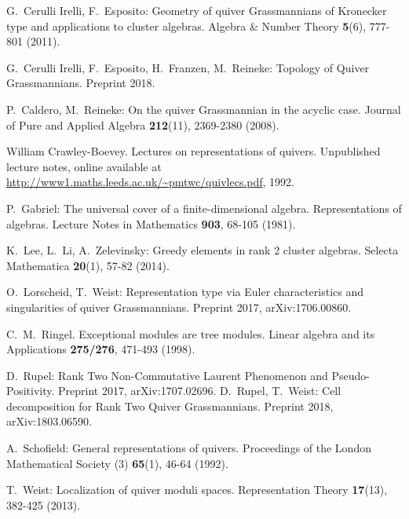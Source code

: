 \documentclass{amsart}
\numberwithin{equation}{section}
\begin{document}
\begin{thebibliography}{10}
  G.~Cerulli Irelli, F.~Esposito: Geometry of quiver Grassmannians of Kronecker type and applications to cluster algebras. Algebra \&  Number Theory \textbf{5}(6), 777-801 (2011).

  G.~Cerulli Irelli, F.~Esposito, H.~Franzen, M.~Reineke: Topology of Quiver Grassmannians. Preprint 2018.

  P.~Caldero, M.~Reineke: On the quiver Grassmannian in the acyclic case. Journal of Pure and Applied Algebra \textbf{212}(11), 2369-2380 (2008).

William Crawley-Boevey. Lectures on representations of quivers. Unpublished lecture notes, online available at \url{http://www1.maths.leeds.ac.uk/~pmtwc/quivlecs.pdf}, 1992.
	

  P.~Gabriel: The universal cover of a finite-dimensional algebra. Representations of algebras. Lecture Notes in Mathematics {\bf 903}, 68-105 (1981).

  K.~Lee, L.~Li, A.~Zelevinsky: Greedy elements in rank 2 cluster algebras. Selecta Mathematica \textbf{20}(1), 57-82 (2014).

  O.~Lorscheid, T.~Weist: Representation type via Euler characteristics and singularities of quiver Grassmannians. Preprint 2017, arXiv:1706.00860.

  C.~M.~Ringel. Exceptional modules are tree modules. Linear algebra and its Applications \textbf{275/276}, 471-493 (1998).

  D.~Rupel: Rank Two Non-Commutative Laurent Phenomenon and Pseudo-Positivity. Preprint 2017, arXiv:1707.02696.
D.~Rupel, T.~Weist: Cell decomposition for Rank Two Quiver Grassmannians. Preprint 2018, arXiv:1803.06590.

  A.~Schofield: General representations of quivers. Proceedings of the London Mathematical Society (3) \textbf{65}(1), 46-64 (1992).

  T.~Weist: Localization of quiver moduli spaces. Representation Theory \textbf{17}(13), 382-425 (2013).

\end{thebibliography}
\end{document}
